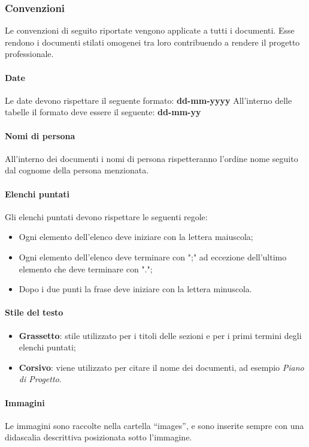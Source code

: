 \subsubsection{Convenzioni}
Le convenzioni di seguito riportate vengono applicate a tutti i documenti.
Esse rendono i documenti stilati omogenei tra loro contribuendo a rendere il progetto professionale.

\paragraph{Date}
Le date devono rispettare il seguente formato: \textbf{dd-mm-yyyy}
All'interno delle tabelle il formato deve essere il seguente: \textbf{dd-mm-yy}
\paragraph{Nomi di persona}
All'interno dei documenti i nomi di persona rispetteranno l'ordine nome seguito dal cognome della persona menzionata.

\paragraph{Elenchi puntati}
Gli elenchi puntati devono rispettare le seguenti regole:
\begin{itemize} 
    \item Ogni elemento dell'elenco deve iniziare con la lettera maiuscola;
    \item Ogni elemento dell'elenco deve terminare con ";" ad eccezione dell'ultimo elemento
    che deve terminare con "."; 
    \item Dopo i due punti la frase deve iniziare con la lettera minuscola.
\end{itemize}

\paragraph{Stile del testo}
\begin{itemize} 
    \item \textbf{Grassetto}: stile utilizzato per i titoli delle sezioni e per i primi termini degli elenchi puntati;
    \item \textbf{Corsivo}: viene utilizzato per citare il nome dei documenti, ad esempio \textit{Piano di Progetto}. 
\end{itemize}

\paragraph{Immagini}
Le immagini sono raccolte nella cartella “images”, e sono inserite sempre con una didascalia descrittiva posizionata sotto l’immagine.

